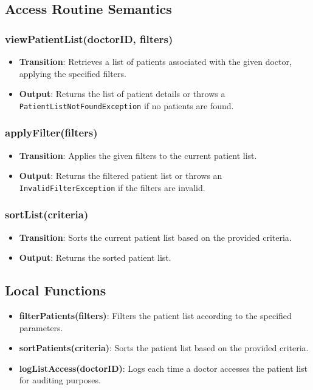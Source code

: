 \documentclass[12pt, titlepage]{article}
\begin{document}
\subsection{Access Routine Semantics}
\subsubsection{viewPatientList(doctorID, filters)}

\begin{itemize}
    \item \textbf{Transition}: Retrieves a list of patients associated with the given doctor, applying the specified filters.
    \item \textbf{Output}: Returns the list of patient details or throws a \texttt{PatientListNotFoundException} if no patients are found.
\end{itemize}

\subsubsection{applyFilter(filters)}

\begin{itemize}
    \item \textbf{Transition}: Applies the given filters to the current patient list.
    \item \textbf{Output}: Returns the filtered patient list or throws an \texttt{InvalidFilterException} if the filters are invalid.
\end{itemize}

\subsubsection{sortList(criteria)}

\begin{itemize}
    \item \textbf{Transition}: Sorts the current patient list based on the provided criteria.
    \item \textbf{Output}: Returns the sorted patient list.
\end{itemize}

\subsection{Local Functions}
\begin{itemize}
\item \textbf{filterPatients(filters)}: Filters the patient list according to the specified parameters.
\item \textbf{sortPatients(criteria)}: Sorts the patient list based on the provided criteria.
\item \textbf{logListAccess(doctorID)}: Logs each time a doctor accesses the patient list for auditing purposes.
\end{itemize}
\end{document}
